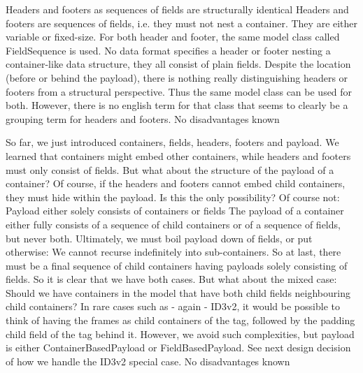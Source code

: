{%
Headers and footers as sequences of fields are structurally identical
}
{%
Headers and footers are sequences of fields, i.e. they must not nest a container. They are either variable or fixed-size. For both header and footer, the same model class called FieldSequence is used.
}
{%
No data format specifies a header or footer nesting a container-like data structure, they all consist of plain fields. Despite the location (before or behind the payload), there is nothing really distinguishing headers or footers from a structural perspective. Thus the same model class can be used for both. However, there is no english term for that class that seems to clearly be a grouping term for headers and footers.
}
{%
No disadvantages known
}

So far, we just introduced containers, fields, headers, footers and payload. We learned that containers might embed other containers, while headers and footers must only consist of fields. But what about the structure of the payload of a container? Of course, if the headers and footers cannot embed child containers, they must hide within the payload. Is this the only possibility? Of course not:
{%
Payload either solely consists of containers or fields
}
{%
The payload of a container either fully consists of a sequence of child containers or of a sequence of fields, but never both.
}
{%
Ultimately, we must boil payload down of fields, or put otherwise: We cannot recurse indefinitely into sub-containers. So at last, there must be a final sequence of child containers having payloads solely consisting of fields. So it is clear that we have both cases. But what about the mixed case: Should we have containers in the model that have both child fields neighbouring child containers? In rare cases such as - again - ID3v2, it would be possible to think of having the frames as child containers of the tag, followed by the padding child field of the tag behind it. However, we avoid such complexities, but payload is either ContainerBasedPayload or FieldBasedPayload. See next design decision of how we handle the ID3v2 special case.
}
{%
No disadvantages known
}

